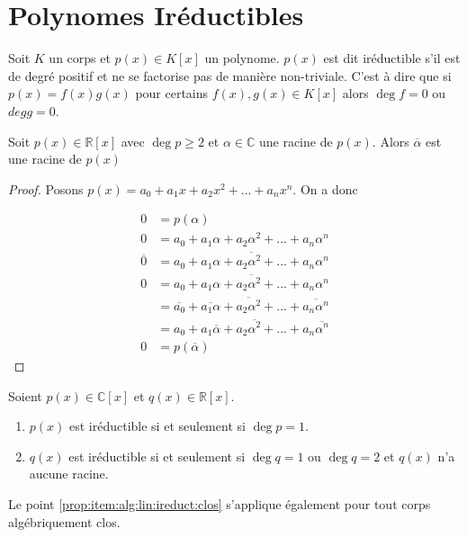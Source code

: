 \label{ch:alg-lin}
\section{Polynomes Iréductibles}
\label{sec:alg:lin:ireduct}

\begin{defn}
Soit $K$ un corps et $p(x)\in K[x]$ un polynome. $p(x)$ est dit iréductible s'il est de degré positif et ne se factorise pas de manière non-triviale. C'est à dire que si $p(x)=f(x)g(x)$ pour certains $f(x),g(x)\in K[x]$ alors $\deg f=0$  ou $deg g=0$.
\end{defn}


\begin{lm}
\label{lm:alg:lin:ireduct:complex-roots}
Soit $p(x)\in\mathbb{R}[x]$ avec $\deg p\geq2$ et $\alpha\in\mathbb{C}$ une racine  de  $p(x)$. Alors $\overline{\alpha}$ est une racine de $p(x)$
\end{lm}
\begin{proof}
Posons $p(x)=a_0+a_1x+a_2x^2+...+a_nx^n$. On a donc

\begin{align*}
0&=p(\alpha)\\
0&=a_0+a_1\alpha+a_2\alpha^2+...+a_n\alpha^n\\
\overline{0}&=\overline{a_0+a_1\alpha+a_2\alpha^2+...+a_n\alpha^n}\\
0&=\overline{a_0+a_1\alpha+a_2\alpha^2+...+a_n\alpha^n}\\
&=\overline{a_0}+\overline{a_1\alpha}+\overline{a_2\alpha^2}+...+\overline{a_n\alpha^n}\\
&=a_0+a_1\overline{\alpha}+a_2\overline{\alpha^2}+...+a_n\overline{\alpha^n}\\
0&=p(\overline{\alpha})
\end{align*}

\end{proof}
\begin{prop}
Soient $p(x)\in\mathbb{C}[x]$ et $q(x)\in\mathbb{R}[x]$.

\begin{enumerate}
\item\label{prop:item:alg:lin:ireduct:clos} $p(x)$  est iréductible si et seulement si $\deg p=1$.
\item $q(x)$ est iréductible si et seulement si $\deg q=1$ ou $\deg q =2$ et $q(x)$ n'a aucune racine.
\end{enumerate}
Le point \ref{prop:item:alg:lin:ireduct:clos} s'applique également pour tout corps algébriquement clos.
\end{prop}
